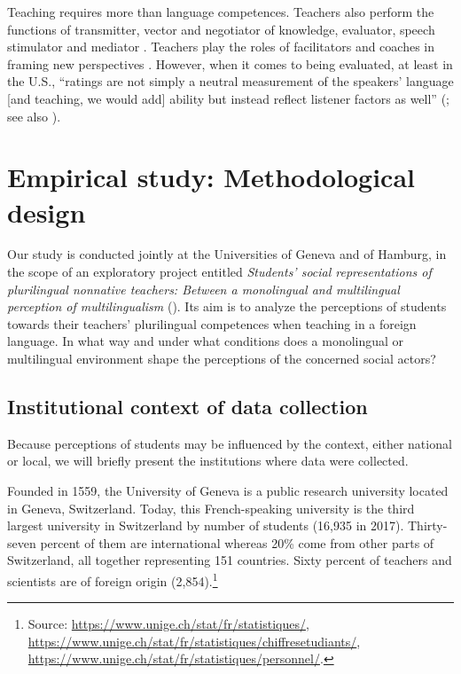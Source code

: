 \documentclass[output=paper]{../langscibook}
\begin{document}
\hspace*{-1mm}Teaching requires more than language competences. Teachers also perform the functions of transmitter, vector and negotiator of knowledge, evaluator, speech stimulator and mediator \citep{Gajo2005}. Teachers play the roles of facilitators and coaches in framing new perspectives \citep{RoussiCherkaoui2011}. However, when it comes to being evaluated, at least in the U.S., “ratings are not simply a neutral measurement of the speakers’ language [and teaching, we would add] ability but instead reflect listener factors as well” (\citealt[700]{KangEtAl2015}; see also \citealt{LindemannSubtirelu2013}).

\section{Empirical study: Methodological design}

Our study is conducted jointly at the Universities of Geneva and of Hamburg, in the scope of an exploratory project entitled \emph{Students’ social representations of plurilingual nonnative teachers: Between a monolingual and multilingual perception of multilingualism} (\citealt{YanaprasartMelo-Pfeifer2017,YanaprasartMelo-Pfeifer2019}). Its aim is to analyze the perceptions of students towards their teachers’ plurilingual competences when teaching in a foreign language. In what way and under what conditions does a monolingual or multilingual environment shape the perceptions of the concerned social actors?

\subsection{Institutional context of data collection}

Because perceptions of students may be influenced by the context, either national or local, we will briefly present the institutions where data were collected. 

Founded in 1559, the University of Geneva is a public research university located in Geneva, Switzerland. Today, this French-speaking university is the third largest university in Switzerland by number of students (16,935 in 2017). Thirty-seven percent of them are international whereas 20\% come from other parts of Switzerland, all together representing 151 countries. Sixty percent of teachers and scientists are of foreign origin (2,854).\footnote{Source: \url{https://www.unige.ch/stat/fr/statistiques/}, \url{https://www.unige.ch/stat/fr/statistiques/chiffresetudiants/}, \url{https://www.unige.ch/stat/fr/statistiques/personnel/}.}
\end{document}
